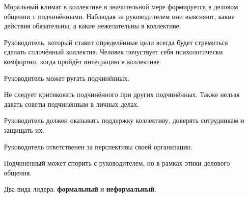 \documentclass[a4paper,14pt]{extarticle}
\begin{document}
Моральный климат в коллективе в значительной мере формируется в деловом общении с подчинёнными. Наблюдая за руководителем они выясняют, какие действия обязательны, а какие нежелательны в коллективе.

Руководитель, который ставит определённые цели всегда будет стремиться сделать сплочённый коллектив. Человек почуствует себя психологически комфортно, когда пройдёт интеграцию в коллективе.

Руководитель может ругать подчинённых.

Не следует критиковать подчинённого при других подчинённых. Также нельзя давать советы подчинённым в личных делах.

Руководитель должен оказывать поддержку коллективу, доверять сотрудникам и защищать их.

Руководитель ответственен за перспективы своей организации.

Подчинённый может спорить с руководителем, но в рамках этики делового общения.

Два вида лидера: \textbf{формальный} и \textbf{неформальный}.
\end{document}
